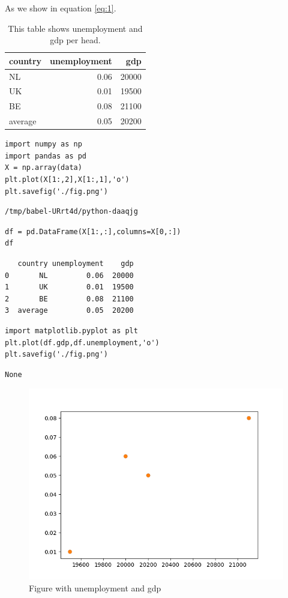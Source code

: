 \documentclass[11pt]{article}
\begin{document}
As we show in equation \eqref{eq:1}.

\begin{table}[htbp]
\caption{\label{table1}This table shows unemployment and gdp per head.}
\centering
\begin{tabular}{lrr}
country & unemployment & gdp\\
\hline
NL & 0.06 & 20000\\
UK & 0.01 & 19500\\
BE & 0.08 & 21100\\
\hline
average & 0.05 & 20200\\
\end{tabular}
\end{table}


\begin{verbatim}
import numpy as np
import pandas as pd
X = np.array(data)
plt.plot(X[1:,2],X[1:,1],'o')
plt.savefig('./fig.png')
\end{verbatim}

\begin{verbatim}
/tmp/babel-URrt4d/python-daaqjg
\end{verbatim}


\begin{verbatim}
df = pd.DataFrame(X[1:,:],columns=X[0,:])
df
\end{verbatim}

\begin{verbatim}
   country unemployment    gdp
0       NL         0.06  20000
1       UK         0.01  19500
2       BE         0.08  21100
3  average         0.05  20200
\end{verbatim}


\begin{verbatim}
import matplotlib.pyplot as plt
plt.plot(df.gdp,df.unemployment,'o')
plt.savefig('./fig.png')
\end{verbatim}

\begin{verbatim}
None
\end{verbatim}


\begin{figure}[htbp]
\centering
\includegraphics[width=.9\linewidth]{./fig.png}
\caption{\label{figure1}Figure with unemployment and gdp}
\end{figure}
\end{document}
